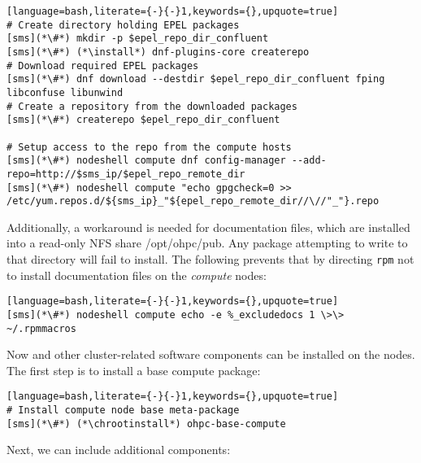 \begin{lstlisting}[language=bash,literate={-}{-}1,keywords={},upquote=true]
# Create directory holding EPEL packages
[sms](*\#*) mkdir -p $epel_repo_dir_confluent
[sms](*\#*) (*\install*) dnf-plugins-core createrepo
# Download required EPEL packages
[sms](*\#*) dnf download --destdir $epel_repo_dir_confluent fping libconfuse libunwind
# Create a repository from the downloaded packages
[sms](*\#*) createrepo $epel_repo_dir_confluent

# Setup access to the repo from the compute hosts
[sms](*\#*) nodeshell compute dnf config-manager --add-repo=http://$sms_ip/$epel_repo_remote_dir
[sms](*\#*) nodeshell compute "echo gpgcheck=0 >> /etc/yum.repos.d/${sms_ip}_"${epel_repo_remote_dir//\//"_"}.repo
\end{lstlisting}


\noindent Additionally, a workaround is needed for \OHPC{} documentation files,
which are installed into a read-only NFS share /opt/ohpc/pub. Any package
attempting to write to that directory will fail to install. The following
prevents that by directing \texttt{rpm} not to install documentation files on
the {\em compute} nodes:

\begin{lstlisting}[language=bash,literate={-}{-}1,keywords={},upquote=true]
[sms](*\#*) nodeshell compute echo -e %_excludedocs 1 \>\> ~/.rpmmacros
\end{lstlisting}

\noindent Now \OHPC{} and other cluster-related software components can be
installed on the nodes. The first step is to install a base compute package:
\begin{lstlisting}[language=bash,literate={-}{-}1,keywords={},upquote=true]
# Install compute node base meta-package
[sms](*\#*) (*\chrootinstall*) ohpc-base-compute
\end{lstlisting}

\noindent Next, we can include additional components:
